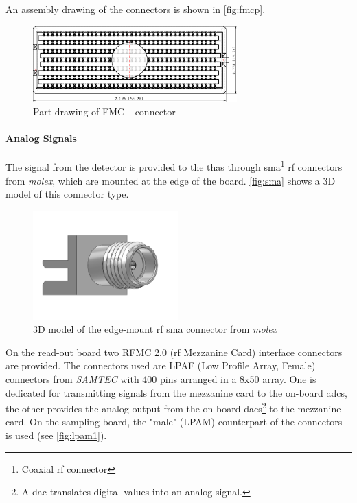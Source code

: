 An assembly drawing of the connectors is shown in \autoref{fig:fmcp}.

\begin{figure}[tbh]
	\centering
	\includegraphics[width = 0.7\textwidth]{chap/04-work/img/fmcp.pdf}
	\caption[Rendering of FMC+ connector]{Part drawing of FMC+ connector \cite{fmcpic}}
	\label{fig:fmcp}
\end{figure}

\paragraph{Analog Signals}
The signal from the detector is provided to the \glspl{tha} through \gls{sma}\footnote{Coaxial \gls{rf} connector} \gls{rf} connectors from \textit{molex}, which are mounted at the edge of the board. \autoref{fig:sma} shows a 3D model of this connector type. 

\begin{figure}[tbh]
	\centering
	\includegraphics[width = 0.5\textwidth]{chap/04-work/img/sma}
	\caption[Edge-Mount RF SMA connector]{3D model of the edge-mount \gls{rf} \gls{sma} connector from \textit{molex} \cite{molex}}
	\label{fig:sma}
\end{figure}

On the read-out board two RFMC 2.0 (\gls{rf} Mezzanine Card) interface connectors are provided. The connectors used are LPAF (Low Profile Array, Female) connectors from \textit{SAMTEC} with 400 pins arranged in a 8x50 array. One is dedicated for transmitting signals from the mezzanine card to the on-board \glspl{adc}, the other provides the analog output from the on-board \glspl{dac}\footnote{A \gls{dac} translates digital values into an analog signal.} to the mezzanine card. On the sampling board, the "male" (LPAM) counterpart of the connectors is used (see \autoref{fig:lpam1}).

